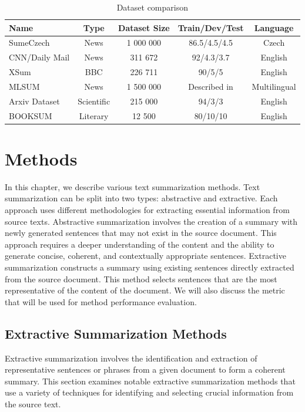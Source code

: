 \documentclass[english, ba, kiv, he, iso690numb, pdf, viewonly]{fasthesis}
\begin{document}
\begin{table}[htbp]
    \centering
    \caption{Dataset comparison}
    \label{tab:datasets}
    \begin{tabular}{lcccc}
        \toprule
        \textbf{Name} & \textbf{Type} & \textbf{Dataset Size} & \textbf{Train/Dev/Test} & \textbf{Language} \\
        \midrule
        SumeCzech & News & 1 000 000 & 86.5/4.5/4.5 & Czech \\
        CNN/Daily Mail & News & 311 672 & 92/4.3/3.7 & English \\
        XSum & BBC & 226 711 & 90/5/5 & English \\
        MLSUM & News & 1 500 000 & Described in \cite{scialom2020mlsum} & Multilingual \\
        Arxiv Dataset & Scientific & 215 000 & 94/3/3 & English \\
        BOOKSUM & Literary & 12 500 & 80/10/10 & English \\
        \bottomrule
    \end{tabular}
\end{table}


%
%
%
%
\chapter{Methods} \label{methods}
In this chapter, we describe various text summarization methods.  
Text summarization can be split into two types: abstractive and extractive. Each approach uses different methodologies for extracting essential information from source texts. Abstractive summarization involves the creation of a summary with newly generated sentences that may not exist in the source document. This approach requires a deeper understanding of the content and the ability to generate concise, coherent, and contextually appropriate sentences. Extractive summarization constructs a summary using existing sentences directly extracted from the source document. This method selects sentences that are the most representative of the content of the document. We will also discuss the metric that will be used for method performance evaluation.
\section{Extractive Summarization Methods}
Extractive summarization involves the identification and extraction of representative sentences or phrases from a given document to form a coherent summary. This section examines notable extractive summarization methods that use a variety of techniques for identifying and selecting crucial information from the source text.
\end{document}
